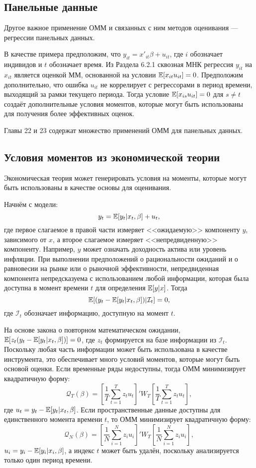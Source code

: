 \subsection{Панельные данные}

Другое важное применение ОММ и связанных с ним методов оценивания --- регрессии панельных данных.

В качестве примера предположим, что $y_{it}=x'_{it}\beta+u_{it}$, где $i$ обозначает индивидов и $t$ обозначает время. Из Раздела 6.2.1 сквозная МНК регрессия $y_{it}$ на $x_{it}$ является оценкой ММ, основанной на условии $\mathbb{E}[x_{it}u_{it}]=0$. Предположим дополнительно, что ошибка $u_{it}$ не коррелирует с регрессорами в период времени, выходящий за рамки текущего периода. Тогда условие $\mathbb{E}[x_{is}u_{it}] = 0$ для $s \not= t$ создаёт дополнительные условия моментов, которые могут быть использованы для получения более эффективных оценок.

Главы 22 и 23 содержат множество применений ОММ для панельных данных.

\subsection{Условия моментов из экономической теории}

Экономическая теория может генерировать условия на моменты, которые могут быть использованы в качестве основы для оценивания.

Начнём с модели:
\[
y_t=\mathbb{E}[y_t|x_t,\beta]+u_t,
\]
где первое слагаемое в правой части измеряет <<ожидаемую>> компоненту $y$, зависимого от $x$, а второе слагаемое измеряет <<непредвиденную>> компоненту. Например, $y$ может означать доходность актива или уровень инфляции. При выполнении предположений о рациональности ожиданий и о равновесии на рынке или о рыночной эффективности, непредвиденная компонента непредсказуема с использованием любой информации, которая была доступна в момент времени $t$ для определения $\mathbb{E}[y|x]$. Тогда
\[
\mathbb{E}[(y_t-\mathbb{E}[y_t|x_t,\beta])|\mathcal{I}_{t}]=0,
\]
где $\mathcal{I}_{t}$ обозначает информацию, доступную на момент $t$.

На основе закона о повторном математическом ожидании, $\mathbb{E}[z_t(y_t-\mathbb{E}[y_t|x_t,\beta])]=0$, где $z_t$ формируется на базе информации из $\mathcal{I}_{t}$. Поскольку любая часть информации может быть использована в качестве инструмента, это обеспечивает много условий моментов, которые могут быть основой оценки. Если временные ряды недоступны, тогда ОММ минимизирует квадратичную форму:
\[
\mathcal{Q}_{T}(\beta)= \left[ \frac{1}{T} \sum_{t=1}^{T} z_t u_t \right]' W_T \left[ \frac{1}{T} \sum_{t=1}^{T} z_t u_t \right],
\]
где $u_t=y_t-\mathbb{E}[y_t|x_t,\beta]$. Если пространственные данные доступны для единственного момента времени $t$, то ОММ минимизирует квадратичную форму:
\[
\mathcal{Q}_{N}(\beta)= \left[ \frac{1}{N} \sum_{i=1}^{N} z_i u_i \right]' W_T \left[ \frac{1}{N} \sum_{i=1}^{N} z_i u_i \right],
\]
$u_i=y_i-\mathbb{E}[y_i|x_i,\beta]$, а индекс $t$ может быть удалён, поскольку анализируется только один период времени.

